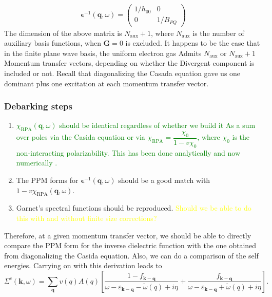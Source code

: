 \begin{align}
    \bm{\epsilon}^{-1}(\mathbf{q}, \omega) = \begin{pmatrix}
        1/h_{00} & 0\\
0 & 1/B_{P Q}
    \end{pmatrix}
\end{align}
The dimension of the above matrix  is $N_{\text{aux}} +1$, where $N_{\text{aux}}$ is the number of auxiliary basis functions, when $\mathbf{G} = 0$ is excluded. It happens to be the case that in the finite plane wave basis, the uniform electron gas Admits $N_{\text{aux}}$ or $N_{\text{aux}} +1$ Momentum transfer vectors, depending on whether the Divergent component is included or not. Recall that diagonalizing the Casada equation gave us one dominant plus one excitation at each momentum transfer vector.
\subsubsection{Debarking steps}
\begin{enumerate}
    \item \textcolor{green}{%
        $\chi_{\mathrm{RPA}}(\mathbf{q}, \omega)$ should be identical regardless of whether we build it As a sum over poles 
        via the Casida equation or via
        $\chi_{\mathrm{RPA}} = \dfrac{\chi_0}{1 - v \chi_0}$, where $\chi_0$ is the non-interacting
        polarizability. This has been done analytically and now numerically .}
    \item The PPM forms for $\boldsymbol{\epsilon}^{-1}(\mathbf{q}, \omega)$ should be a good match with
          $1 - v \chi_{\mathrm{RPA}}(\mathbf{q}, \omega)$.
    \item Garnet's spectral functions should be reproduced. \textcolor{yellow}{Should we be able to do this with and without finite size corrections? }
\end{enumerate}
 Therefore, at a given momentum transfer vector, we should be able to directly compare the PPM form for the inverse dielectric function with the one obtained from diagonalizing the Casida equation. Also, we can do a comparison of the self energies. 
Carrying on with this derivation leads to
\begin{equation}
\Sigma^c(\mathbf{k}, \omega)=\sum_{\mathbf{q}} v(q) A(q)\left[\frac{1-f_{\mathbf{k}-\mathbf{q}}}{\omega-\varepsilon_{\mathbf{k}-\mathbf{q}}-\tilde{\omega}(q)+i \eta}+\frac{f_{\mathbf{k}-\mathbf{q}}}{\omega-\varepsilon_{\mathbf{k}-\mathbf{q}}+\tilde{\omega}(q)+i \eta}\right].
\end{equation}
